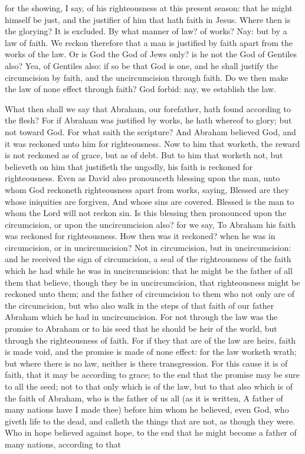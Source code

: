 for the showing, I say, of his righteousness at this present season: that he might himself be just, and the justifier of him that hath faith in Jesus. Where then is the glorying? It is excluded. By what manner of law? of works? Nay: but by a law of faith. We reckon therefore that a man is justified by faith apart from the works of the law. Or is God the God of Jews only? is he not the God of Gentiles also? Yea, of Gentiles also: if so be that God is one, and he shall justify the circumcision by faith, and the uncircumcision through faith.  Do we then make the law of none effect through faith? God forbid: nay, we establish the law. 

What then shall we say that Abraham, our forefather, hath found according to the flesh? For if Abraham was justified by works, he hath whereof to glory; but not toward God. For what saith the scripture? And Abraham believed God, and it was reckoned unto him for righteousness. Now to him that worketh, the reward is not reckoned as of grace, but as of debt. But to him that worketh not, but believeth on him that justifieth the ungodly, his faith is reckoned for righteousness. Even as David also pronounceth blessing upon the man, unto whom God reckoneth righteousness apart from works, saying, Blessed are they whose iniquities are forgiven, And whose sins are covered.  Blessed is the man to whom the Lord will not reckon sin.  Is this blessing then pronounced upon the circumcision, or upon the uncircumcision also? for we say, To Abraham his faith was reckoned for righteousness. How then was it reckoned? when he was in circumcision, or in uncircumcision? Not in circumcision, but in uncircumcision: and he received the sign of circumcision, a seal of the righteousness of the faith which he had while he was in uncircumcision: that he might be the father of all them that believe, though they be in uncircumcision, that righteousness might be reckoned unto them; and the father of circumcision to them who not only are of the circumcision, but who also walk in the steps of that faith of our father Abraham which he had in uncircumcision. For not through the law was the promise to Abraham or to his seed that he should be heir of the world, but through the righteousness of faith. For if they that are of the law are heirs, faith is made void, and the promise is made of none effect: for the law worketh wrath; but where there is no law, neither is there transgression. For this cause it is of faith, that it may be according to grace; to the end that the promise may be sure to all the seed; not to that only which is of the law, but to that also which is of the faith of Abraham, who is the father of us all (as it is written, A father of many nations have I made thee) before him whom he believed, even God, who giveth life to the dead, and calleth the things that are not, as though they were. Who in hope believed against hope, to the end that he might become a father of many nations, according to that 